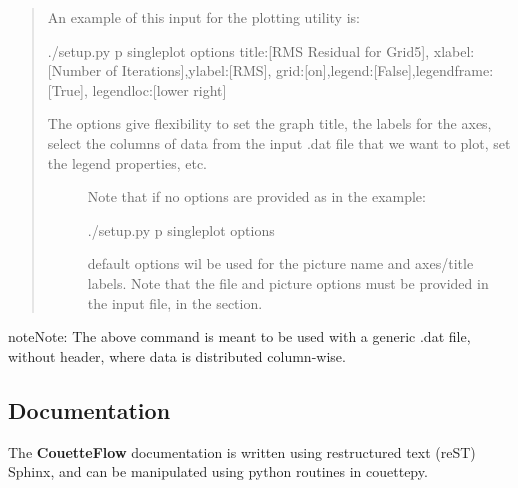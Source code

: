 \documentclass[letterpaper,10pt,english]{sphinxmanual}
\begin{document}
\begin{quote}

An example of this input for the plotting utility is:

\begin{sphinxVerbatim}[commandchars=\\\{\}]
\PYGZdl{} ./setup.py \PYGZhy{}p single\PYGZus{}plot options \PYGZdq{}\PYGZob{}\PYGZsq{}title\PYGZsq{}:[\PYGZsq{}RMS Residual for Grid\PYGZsh{}5\PYGZsq{}],
  \PYGZsq{}xlabel\PYGZsq{}:[\PYGZsq{}Number of Iterations\PYGZsq{}],\PYGZsq{}ylabel\PYGZsq{}:[\PYGZsq{}RMS\PYGZsq{}],
  \PYGZsq{}grid\PYGZsq{}:[\PYGZsq{}on\PYGZsq{}],\PYGZsq{}legend\PYGZsq{}:[\PYGZsq{}False\PYGZsq{}],\PYGZsq{}legend\PYGZus{}frame\PYGZsq{}:[\PYGZsq{}True\PYGZsq{}],
  \PYGZsq{}legend\PYGZus{}loc\PYGZsq{}:[\PYGZsq{}lower right\PYGZsq{}]\PYGZcb{}\PYGZdq{}
\end{sphinxVerbatim}
\begin{description}
\item[{The options give flexibility to set the graph title, the labels for the axes, select the columns of data from the input .dat file that we want to plot, set the legend properties, etc.}] \leavevmode
Note that if no options are provided as in the example:

\begin{sphinxVerbatim}[commandchars=\\\{\}]
\PYGZdl{} ./setup.py \PYGZhy{}p single\PYGZus{}plot options
\end{sphinxVerbatim}

default options wil be used for the picture name and axes/title labels.
Note that the file and picture options must be provided in the input file,
in the  section.

\end{description}
\end{quote}

\begin{sphinxadmonition}{note}{Note:}
The above command is meant to be used with a generic .dat file, without header, where data is distributed column-wise.
\end{sphinxadmonition}


\subsection{Documentation}
\label{\detokenize{couettepyfiles/documentation:documentation}}\label{\detokenize{couettepyfiles/documentation::doc}}\label{\detokenize{couettepyfiles/documentation:id1}}
The {\color{red}\bfseries{}\textbar{}CouetteFlow\textbar{}} documentation is written using restructured text (reST) Sphinx, and can be manipulated using python routines in couettepy.
\end{document}
